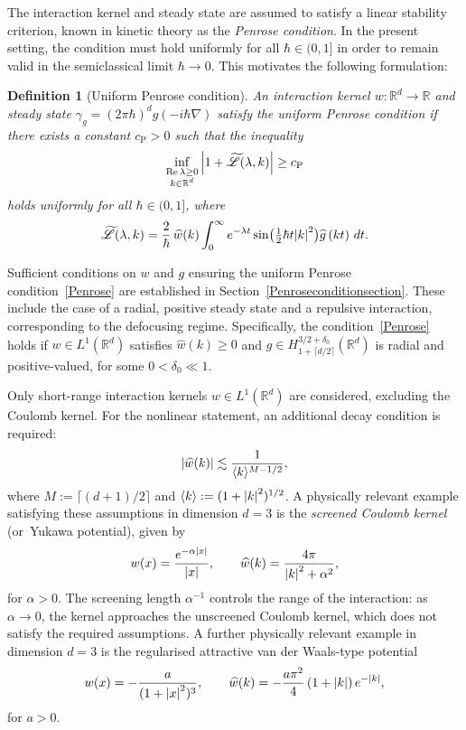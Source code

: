 \documentclass[10pt,a4paper]{amsart}
\theoremstyle{plain}
\newtheorem{definition}[theorem]{Definition}
\theoremstyle{remark}
\newcommand{\br}[1]{\left(#1\right)}
\newcommand{\bbr}[1]{\bigl(#1 \bigr)}
\newcommand{\ak}{\abs{k}}
\newcommand{\jb}[1]{\langle#1\rangle}
\newcommand{\R}{\mathbb{R}}
\newcommand{\lam}{\lambda}
\begin{document}
The interaction kernel and steady state are assumed to satisfy a linear stability criterion, known in kinetic theory as the \textit{Penrose condition}. In the present setting, the condition must hold uniformly for all $\hbar \in (0,1]$ in order to remain valid in the semiclassical limit $\hbar \to 0$. This motivates the following formulation:

\begin{definition}[Uniform Penrose condition]
An interaction kernel \(w\colon \R^d \to \R\) and steady state \(\gamma_g = (2\pi\hbar)^d g(-i\hbar\nabla)\) satisfy the uniform Penrose condition if there exists a constant \({c_{\mathrm{P}}} > 0\) such that the inequality
\begin{align}\label{Penrose}
\inf_{\substack{\Re\lambda \geq 0 \\ k \in \R^d}} \abs{1 + \widetilde{\mathscr{L}}(\lambda, k)} \geq {c_{\mathrm{P}}}
\end{align}
holds uniformly for all \(\hbar \in (0,1]\), where
\[
\widetilde{\mathscr{L}}(\lambda, k) = \frac{2}{\hbar}\, \widehat{w}(k) \int_0^\infty e^{-\lam t}\sin\bbr{\tfrac{1}{2}\hbar t \ak^2} \widehat{g}\br{kt}\,dt.
\]

\end{definition}
Sufficient conditions on $w$ and $g$ ensuring the uniform Penrose condition~\eqref{Penrose} are established in Section~\ref{Penroseconditionsection}. These include the case of a radial, positive steady state and a repulsive interaction, corresponding to the defocusing regime. Specifically, the condition~\eqref{Penrose} holds if \( w \in L^1(\R^d) \) satisfies \( \widehat{w}(k) \geq 0 \) and \( g \in H^{3/2+\delta_0}_{1+\lceil d/2 \rceil}(\R^d) \) is radial and positive-valued, for some \( 0 < \delta_0 \ll 1 \).

Only short-range interaction kernels \( w \in L^1(\R^d) \) are considered, excluding the Coulomb kernel. For the nonlinear statement, an additional decay condition is required:
\[
\abs{\widehat{w}(k)} \lesssim \frac{1}{\jb{k}^{M-1/2}},
\]
where \( M := \lceil (d+1)/2 \rceil \) and \( \jb{k} := (1 + \abs{k}^2)^{1/2} \). A physically relevant example satisfying these assumptions in dimension \( d = 3 \) is the \textit{screened Coulomb kernel} (or~Yukawa potential), given by
\[
w(x) = \frac{e^{-\alpha\abs{x}}}{\abs{x}}, \qquad \widehat{w}(k) = \frac{4\pi}{\abs{k}^2 + \alpha^2},
\]
for \( \alpha > 0 \). The screening length \( \alpha^{-1} \) controls the range of the interaction: as \( \alpha \to 0 \), the kernel approaches the unscreened Coulomb kernel, which does not satisfy the required assumptions. A further physically relevant example in dimension $d=3$ is the regularised attractive van der Waals-type potential
\[w(x)=-\frac{a}{(1+\abs{x}^2)^3},\qquad \widehat w(k)=-\frac{a\pi^2}{4}\br{1+\ak}e^{-\ak},\]
for $a>0$.
\end{document}
